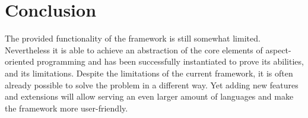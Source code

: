 \documentclass[a4paper]{report}
\begin{document}
\chapter{Conclusion}
\label{chap:Conclusion}
The provided functionality of the framework is still somewhat limited. Nevertheless it is able to achieve an abstraction of the core elements of aspect-oriented programming and has been successfully instantiated to prove its abilities, and its limitations. Despite the limitations of the current framework, it is often already possible to solve the problem in a different way. Yet adding new features and extensions will allow serving an even larger amount of languages and make the framework more user-friendly.



\end{document}
